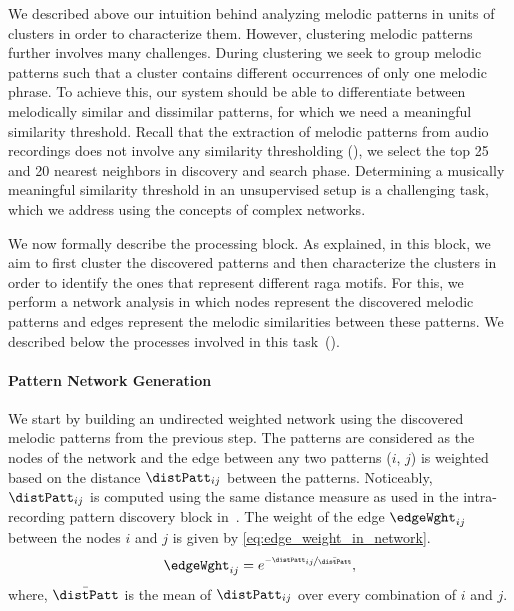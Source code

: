 {We described above our intuition behind analyzing melodic patterns in units of clusters in order to characterize them. However, clustering melodic patterns further involves many challenges. During clustering we seek to group melodic patterns such that a cluster contains different occurrences of only one melodic phrase. To achieve this, our system should be able to differentiate between melodically similar and dissimilar patterns, for which we need a meaningful similarity threshold. Recall that the extraction of melodic patterns from audio recordings does not involve any similarity thresholding (), we select the top 25 and 20 nearest neighbors in discovery and search phase. Determining a musically meaningful similarity threshold in an unsupervised setup is a challenging task, which we address using the concepts of complex networks. 
 
We now formally describe the processing block. As explained, in this block, we aim to first cluster the discovered patterns and then characterize the clusters in order to identify the ones that represent different \gls{raga} motifs. For this, we perform a network analysis in which nodes represent the discovered melodic patterns and edges represent the melodic similarities between these patterns. We described below the processes involved in this task~(). 


\paragraph{Pattern Network Generation}
\label{sec:network_generation}

We start by building an undirected weighted network using the discovered melodic patterns from the previous step. The patterns are considered as the nodes of the network and the edge between any two patterns ($i$, $j$) is weighted based on the distance $\distPatt_{ij}$ between the patterns. Noticeably, $\distPatt_{ij}$ is computed using the same distance measure as used in the intra-recording pattern discovery block in~. The weight of the edge $\edgeWght_{ij}$ between the nodes $i$ and $j$ is given by \eqref{eq:edge_weight_in_network}. 
\begin{equation}
\edgeWght_{ij} = e^{\nicefrac{-\distPatt_{ij}}{\bar{\distPatt}}},
\label{eq:edge_weight_in_network}
\end{equation}
\noindent where, $\bar{\distPatt}$ is the mean of $\distPatt_{ij}$ over every combination of $i$ and $j$. 


}
